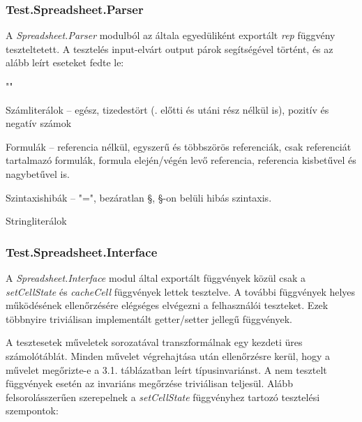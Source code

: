 \subsubsection{Test.Spreadsheet.Parser}

A \textit{Spreadsheet.Parser} modulból az általa egyedüliként exportált \textit{rep} függvény teszteltetett. A tesztelés input-elvárt output párok segítségével történt, és az alább leírt eseteket fedte le:

\begin{compactenum}
	\item ""
	\item Számliterálok -- egész, tizedestört (. előtti és utáni rész nélkül is), pozitív és negatív számok
	\item Formulák -- referencia nélkül, egyszerű és többszörös referenciák, csak referenciát tartalmazó formulák, formula elején/végén levő referencia, referencia kisbetűvel és nagybetűvel is.
	\item Szintaxishibák -- "=", bezáratlan §, §-on belüli hibás szintaxis.
	\item Stringliterálok
\end{compactenum}

\subsubsection{Test.Spreadsheet.Interface}

A \textit{Spreadsheet.Interface} modul által exportált függvények közül
csak a \textit{setCellState} és \textit{cacheCell} függvények lettek tesztelve. A további függvények helyes működésének ellenőrzésére elégséges elvégezni a felhasználói teszteket. Ezek többnyire triviálisan implementált getter/setter jellegű függvények.

A tesztesetek műveletek sorozatával transzformálnak egy kezdeti üres számolótáblát. Minden művelet végrehajtása után ellenőrzésre kerül, hogy a művelet megőrizte-e a 3.1. táblázatban leírt típusinvariánst. A nem tesztelt függvények esetén az invariáns megőrzése triviálisan teljesül.
Alább felsorolásszerűen szerepelnek a \textit{setCellState} függvényhez tartozó tesztelési szempontok:

